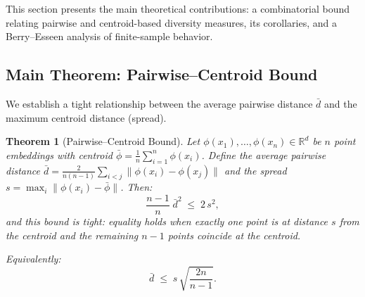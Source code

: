 \documentclass[11pt,a4paper]{article}
\newtheorem{theorem}{Theorem}[section]
\newcommand{\R}{\mathbb{R}}
\begin{document}
This section presents the main theoretical contributions:
a combinatorial bound relating pairwise and centroid-based
diversity measures, its corollaries, and a Berry--Esseen
analysis of finite-sample behavior.

\subsection{Main Theorem: Pairwise--Centroid Bound}

We establish a tight relationship between the average pairwise
distance $\bar{d}$ and the maximum centroid distance (spread).

\begin{theorem}[Pairwise--Centroid Bound]\label{thm:main}
Let $\phi(x_1), \ldots, \phi(x_n) \in \R^d$ be $n$ point
embeddings with centroid
$\bar{\phi} = \frac{1}{n}\sum_{i=1}^n \phi(x_i)$.
Define the average pairwise distance
$\bar{d} = \frac{2}{n(n-1)} \sum_{i < j}
\|\phi(x_i) - \phi(x_j)\|$
and the spread
$s = \max_i \|\phi(x_i) - \bar{\phi}\|$.
Then:
\begin{equation}\label{eq:main_bound}
  \frac{n-1}{n}\;\bar{d}^2
  \;\leq\;
  2\,s^2,
\end{equation}
and this bound is tight: equality holds when exactly one point
is at distance $s$ from the centroid and the remaining $n-1$
points coincide at the centroid.

Equivalently:
\begin{equation}\label{eq:main_equiv}
  \bar{d} \;\leq\; s\,\sqrt{\frac{2n}{n-1}}.
\end{equation}
\end{theorem}
\end{document}
